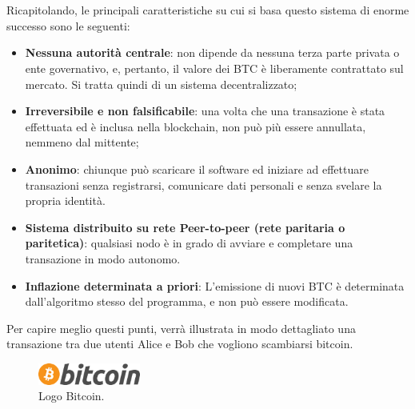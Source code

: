 \\
\\Ricapitolando, le principali caratteristiche su cui si basa questo sistema di enorme successo sono le seguenti:
\begin{itemize}
\item \textbf{Nessuna autorità centrale}: non dipende da nessuna terza parte privata o ente governativo, e, pertanto, il valore dei BTC è liberamente contrattato sul mercato. Si tratta quindi di un sistema decentralizzato;
\item \textbf{Irreversibile e non falsificabile}: una volta che una transazione è stata effettuata ed è inclusa nella blockchain, non può più essere annullata, nemmeno dal mittente;
\item \textbf{Anonimo}: chiunque può scaricare il software ed iniziare ad effettuare transazioni senza registrarsi, comunicare dati personali e senza svelare la propria identità.
\item \textbf{Sistema distribuito su rete Peer-to-peer (rete paritaria o paritetica)}: qualsiasi nodo è in grado di avviare e completare una transazione in modo autonomo.
\item \textbf{Inflazione determinata a priori}: L’emissione di nuovi BTC è determinata dall’algoritmo stesso del programma, e non può essere modificata.
\end{itemize}
Per capire meglio questi punti, verrà illustrata in modo dettagliato una transazione tra due utenti Alice e Bob che vogliono scambiarsi bitcoin.

\begin{figure}[H]
	\centering
	\includegraphics[width=0.3\textwidth]{images/bitcoinLogo.png}
	\caption{Logo Bitcoin.}
	\label{fig:bitcoinLogo}
\end{figure}

